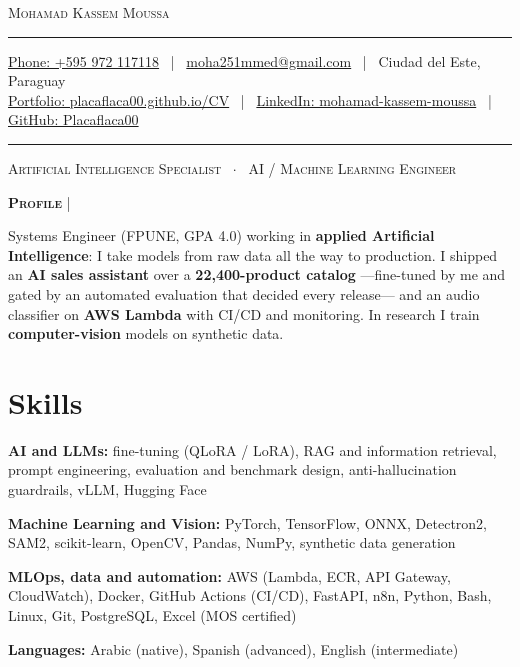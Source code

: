 \documentclass[letterpaper,10pt]{article}
\newcommand{\documentTitle}[2]{
  \begin{center}
    {\Huge\scshape\color{accentTitle} #1}
    \vspace{10pt}
    {\color{accentLine} \hrule}
    \vspace{2pt}
    \footnotesize{#2}
    \vspace{2pt}
    {\color{accentLine} \hrule}
  \end{center}
}
\newcommand{\documentSubtitle}[1]{
  \vspace{-4pt}
  \begin{center}
    {\scshape\color{accentText} #1}
  \end{center}
  \vspace{-6pt}
}
\newcommand{\tinysection}[1]{
  \phantomsection
  \addcontentsline{toc}{section}{#1}
  {\scshape\large{\bfseries\color{accentText}#1} {\color{accentLine} |}}
}
\newenvironment{resume_list}{
  \vspace{-7pt}
  \begin{itemize}[itemsep=-2px, parsep=1pt, leftmargin=30pt]
}{
  \end{itemize}
}
\begin{document}

  \documentTitle{Mohamad Kassem Moussa}{
    \href{tel:+595972117118}{Phone: +595 972 117118} ~|~
    \href{mailto:moha251mmed@gmail.com}{moha251mmed@gmail.com} ~|~
    Ciudad del Este, Paraguay \\
    \vspace{2pt}
    \href{https://placaflaca00.github.io/CV/}{Portfolio: placaflaca00.github.io/CV} ~|~
    \href{https://www.linkedin.com/in/mohamad-kassem-moussa-57b3261b8/}{LinkedIn: mohamad-kassem-moussa} ~|~
    \href{https://github.com/Placaflaca00}{GitHub: Placaflaca00}
  }

  \documentSubtitle{Artificial Intelligence Specialist ~$\cdot$~ AI / Machine Learning Engineer}


  \tinysection{Profile}
  Systems Engineer (FPUNE, GPA 4.0) working in \textbf{applied Artificial Intelligence}: I take models from raw data all the way to production. I shipped an \textbf{AI sales assistant} over a \textbf{22,400-product catalog} —fine-tuned by me and gated by an automated evaluation that decided every release— and an audio classifier on \textbf{AWS Lambda} with CI/CD and monitoring. In research I train \textbf{computer-vision} models on synthetic data.


  \section{Skills}

  \begin{resume_list}
    \item \textbf{AI and LLMs:} fine-tuning (QLoRA / LoRA), RAG and information retrieval, prompt engineering, evaluation and benchmark design, anti-hallucination guardrails, vLLM, Hugging Face
    \item \textbf{Machine Learning and Vision:} PyTorch, TensorFlow, ONNX, Detectron2, SAM2, scikit-learn, OpenCV, Pandas, NumPy, synthetic data generation
    \item \textbf{MLOps, data and automation:} AWS (Lambda, ECR, API Gateway, CloudWatch), Docker, GitHub Actions (CI/CD), FastAPI, n8n, Python, Bash, Linux, Git, PostgreSQL, Excel (MOS certified)
    \item \textbf{Languages:} Arabic (native), Spanish (advanced), English (intermediate)
  \end{resume_list}
\end{document}
